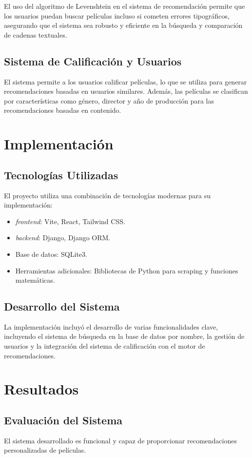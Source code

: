 \documentclass{llncs}
\begin{document}
	
	El uso del algoritmo de Levenshtein en el sistema de recomendación permite que los usuarios puedan buscar películas incluso si cometen errores tipográficos, asegurando que el sistema sea robusto y eficiente en la búsqueda y comparación de cadenas textuales.
	
	\subsection{Sistema de Calificación y Usuarios}
	El sistema permite a los usuarios calificar películas, lo que se utiliza para generar recomendaciones basadas en usuarios similares. Además, las películas se clasifican por características como género, director y año de producción para las recomendaciones basadas en contenido.
	
	\section{Implementación}
	\subsection{Tecnologías Utilizadas}
	El proyecto utiliza una combinación de tecnologías modernas para su implementación:
	\begin{itemize}
		\item 	\textit{frontend}: Vite, React, Tailwind CSS.
		\item 	\textit{backend}: Django, Django ORM.
		\item Base de datos: SQLite3.
		\item Herramientas adicionales: Bibliotecas de Python para scraping y funciones matemáticas.
	\end{itemize}
	
	\subsection{Desarrollo del Sistema}
	La implementación incluyó el desarrollo de varias funcionalidades clave, incluyendo el sistema de búsqueda en la base de datos por nombre, la gestión de usuarios y la integración del sistema de calificación con el motor de recomendaciones.
	
	\section{Resultados}
	\subsection{Evaluación del Sistema}
	El sistema desarrollado es funcional y capaz de proporcionar recomendaciones personalizadas de películas. 
	
\end{document}
